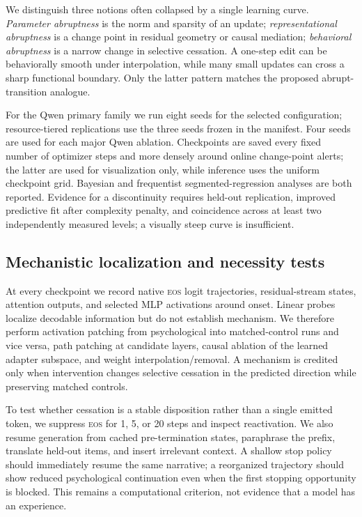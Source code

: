 \documentclass[10pt,twocolumn]{article}
\newcommand{\EOS}{\textsc{eos}}
\begin{document}
We distinguish three notions often collapsed by a single learning curve.
\emph{Parameter abruptness} is the norm and sparsity of an update;
\emph{representational abruptness} is a change point in residual geometry or
causal mediation; \emph{behavioral abruptness} is a narrow change in selective
cessation. A one-step edit can be behaviorally smooth under interpolation, while
many small updates can cross a sharp functional boundary. Only the latter
pattern matches the proposed abrupt-transition analogue.

For the Qwen primary family we run eight seeds for the selected configuration;
resource-tiered replications use the three seeds frozen in the manifest. Four
seeds are used for each major Qwen ablation. Checkpoints are saved every
fixed number of optimizer steps and more densely around online change-point
alerts; the latter are used for visualization only, while inference uses the
uniform checkpoint grid. Bayesian and frequentist segmented-regression analyses
are both reported. Evidence for a discontinuity requires held-out replication,
improved predictive fit after complexity penalty, and coincidence across at
least two independently measured levels; a visually steep curve is insufficient.

\subsection{Mechanistic localization and necessity tests}

At every checkpoint we record native \EOS{} logit trajectories, residual-stream
states, attention outputs, and selected MLP activations around onset. Linear
probes localize decodable information but do not establish mechanism. We
therefore perform activation patching from psychological into matched-control
runs and vice versa, path patching at candidate layers, causal ablation of the
learned adapter subspace, and weight interpolation/removal. A mechanism is
credited only when intervention changes selective cessation in the predicted
direction while preserving matched controls.

To test whether cessation is a stable disposition rather than a single emitted
token, we suppress \EOS{} for 1, 5, or 20 steps and inspect reactivation. We also
resume generation from cached pre-termination states, paraphrase the prefix,
translate held-out items, and insert irrelevant context. A shallow stop policy
should immediately resume the same narrative; a reorganized trajectory should
show reduced psychological continuation even when the first stopping opportunity
is blocked. This remains a computational criterion, not evidence that a model
has an experience.
\end{document}
